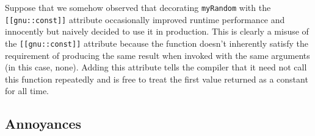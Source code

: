 \noindent Suppose that we somehow observed that decorating \lstinline!myRandom! with
the \lstinline![[gnu::const]]! attribute occasionally improved runtime
performance and innocently but naively decided to use it in production. This
is clearly a misuse of the \lstinline![[gnu::const]]! attribute because the
function doesn't inherently satisfy the requirement of producing the
same result when invoked with the same arguments (in this case, none).
Adding this attribute tells the compiler that it need not call this
function repeatedly and is free to treat the first value returned as a
constant for all time.

%
%
%
%

\subsection[Annoyances]{Annoyances}\label{annoyances}


